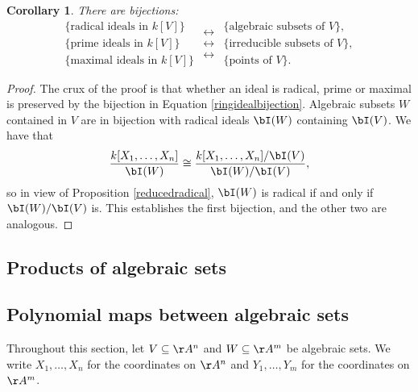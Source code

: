 \documentclass[12pt]{amsart}
\theoremstyle{plain}
\newtheorem{corollary}[theorem]{Corollary}
\theoremstyle{definition}
\begin{document}
\begin{corollary}\label{corollary:coordinateringbijections}
There are bijections:
$$
\begin{array}{c}
\{\text{radical ideals in } k[V] \} \\
\{\text{prime ideals in } k[V] \} \\
\{\text{maximal ideals in } k[V] \} 
\end{array}
\begin{array}{c}
\longleftrightarrow \\
\longleftrightarrow \\
\longleftrightarrow  
\end{array}
\begin{array}{c}
\{\text{algebraic subsets of } V \}, \\
\{\text{irreducible subsets of } V\}, \\
\{\text{points of } V\} .
\end{array}
$$
\end{corollary}
\begin{proof}
The crux of the proof is that whether an ideal is radical, prime or maximal is preserved by the bijection in Equation \ref{ringidealbijection}.
Algebraic subsets $W$ contained in $V$ are in bijection with radical ideals $\bI(W)$ containing $\bI(V)$.
We have that
$$\frac{k[X_1, \ldots, X_n]}{\bI(W)} \cong \frac{k[X_1, \ldots, X_n]/\bI(V)}{\bI(W)/\bI(V)},$$
so in view of Proposition \ref{reducedradical}, $\bI(W)$ is radical if and only if $\bI(W)/\bI(V)$ is.
This establishes the first bijection, and the other two are analogous.
\end{proof}





\subsection{Products of algebraic sets}





\subsection{Polynomial maps between algebraic sets}\label{section:polynomialmaps}
Throughout this section, let $V \subseteq \AA^n$ and $W \subseteq \AA^m$ be algebraic sets.
We write $X_1, \ldots, X_n$ for the coordinates on $\AA^n$ and $Y_1, \ldots, Y_m$ for the coordinates on $\AA^m$.
\end{document}
